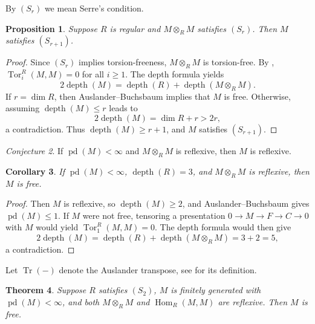 \documentclass[11.05pt,a4paper]{amsart}
\newtheorem{theorem}{Theorem}[section]
\newtheorem{proposition}[theorem]{Proposition}
\newtheorem{corollary}[theorem]{Corollary}
\theoremstyle{definition}
\theoremstyle{remark}
\newtheorem{conjecture}[theorem]{Conjecture}
\newcommand{\Tr}{\operatorname{Tr}}
\newcommand{\pd}{\operatorname{pd}}
\newcommand{\Tor}{\operatorname{Tor}}
\newcommand{\Hom}{\operatorname{Hom}}
\newcommand{\depth}{\operatorname{depth}}
\begin{document}
By \( (S_r) \) we mean Serre's condition.

\begin{proposition}
	Suppose \( R \) is regular and \( M \otimes_R M \) satisfies \( (S_r) \). Then \( M \) satisfies \( (S_{r+1}) \).
\end{proposition}

\begin{proof}
	Since \( (S_r) \) implies torsion-freeness, \( M \otimes_R M \) is torsion-free. By \cite{au}, \( \Tor_i^R(M,M)=0 \) for all \( i \ge 1 \). The depth formula yields
	\[
	2\depth(M) = \depth(R) + \depth(M \otimes_R M).
	\]
	If \( r = \dim R \), then Auslander–Buchsbaum implies that \( M \) is free. Otherwise, assuming \( \depth(M) \le r \) leads to
	\[
	2\depth(M) = \dim R + r > 2r,
	\]
	a contradiction. Thus \( \depth(M) \ge r+1 \), and \( M \) satisfies \( (S_{r+1}) \).
\end{proof}

\begin{conjecture}
	If \( \pd(M) < \infty \) and \( M \otimes_R M \) is reflexive, then \( M \) is reflexive.
\end{conjecture}

\begin{corollary}
	If \( \pd(M) < \infty \), \( \depth(R)=3 \), and \( M \otimes_R M \) is reflexive, then \( M \) is free.
\end{corollary}

\begin{proof}
	Then \( M \) is reflexive, so \( \depth(M) \ge 2 \), and Auslander–Buchsbaum gives \( \pd(M) \le 1 \). If \( M \) were not free, tensoring a presentation \( 0 \to M \to F \to C \to 0 \) with \( M \) would yield \( \Tor_1^R(M,M)=0 \). The depth formula would then give
	\[
	2\depth(M) = \depth(R) + \depth(M \otimes_R M) = 3 + 2 = 5,
	\]
	a contradiction.
\end{proof}

Let \( \Tr(-) \) denote the Auslander transpose, see \cite{AB} for  its definition.

\begin{theorem}\label{44}
	Suppose \( R \) satisfies \( (S_2) \), \( M \) is finitely generated with \( \pd(M) < \infty \), and both \( M \otimes_R M \) and \( \Hom_R(M,M) \) are reflexive. Then \( M \) is free.
\end{theorem}
\end{document}
